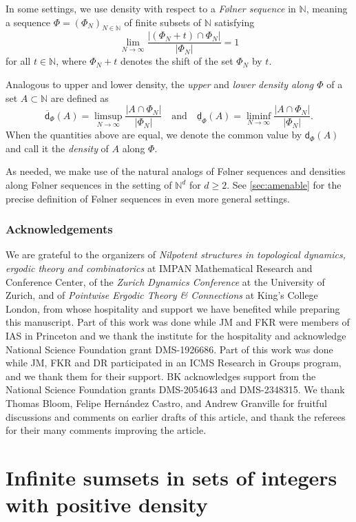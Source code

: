 \documentclass[10pt,dvipsnames]{article}
\theoremstyle{definition}
\theoremstyle{plain}
\newcommand{\define}[1]{\textit{#1}}
\newcommand{\N}{\mathbb{N}}
\newcommand{\dens}{\mathsf{d}}
\newcommand{\udens}{\overline{\mathsf{d}}}
\newcommand{\ldens}{\underline{\mathsf{d}}}
\newcommand{\Folner}{F\o{}lner}
\begin{document}
In some settings, we  use  density with respect to a \define{\Folner{} sequence}  in $\N$, meaning a sequence $\Phi=(\Phi_N)_{N\in\N}$ of finite subsets of  $\N$ satisfying 
$$
\lim_{N\to\infty} \frac{|(\Phi_N+t)\cap \Phi_N|}{|
\Phi_N|} = 1
$$
for all $t\in\N$, where $\Phi_N+t$ denotes the shift of the set $\Phi_N$ by $t$. 

Analogous to upper and lower density, the \define{upper} and \define{lower density along $\Phi$} of a set $A\subset\N$ are defined as
\[
\udens_\Phi(A) = \limsup_{N\to\infty}\frac{|A\cap \Phi_N|}{|\Phi_N|}
\quad
\text{and}
\quad 
\ldens_\Phi(A)=\liminf_{N\to\infty}\frac{|A\cap \Phi_N|}{|\Phi_N|}.
\]
When the quantities above are equal, we denote the common value by $\dens_\Phi(A)$ and call it the \define{density} of $A$ along $\Phi$.

As needed, we make use of the natural  analogs of \Folner{} sequences and densities along \Folner{} sequences in the setting of $\N^d$ for $d\geq 2$.
See \cref{sec:amenable} for the precise definition of \Folner{} sequences in even more general settings.

\subsubsection*{Acknowledgements}
We are grateful to the organizers of \textit{Nilpotent structures in topological dynamics, ergodic theory and combinatorics} at IMPAN Mathematical Research and Conference Center, of the \textit{Zurich Dynamics Conference} at the University of Zurich, and of \textit{Pointwise Ergodic Theory \& Connections} at King's College London,  from whose hospitality and support we have benefited while preparing this manuscript. 
Part of this work was done while JM and FKR were members of IAS in Princeton and we thank the institute for the hospitality and acknowledge National Science Foundation grant  DMS-1926686.
Part of this work was done while JM, FKR and DR participated in an ICMS Research in Groups program, and we thank them for their support.
BK acknowledges support from the National
Science Foundation grants DMS-2054643 and DMS-2348315. We thank Thomas Bloom, Felipe Hern{\'a}ndez Castro, and Andrew Granville for fruitful discussions and comments on earlier drafts of this article, and thank the referees for their many comments improving the article.

\section{Infinite sumsets in sets of integers with positive density}
\label{sec:sumsets_integers}
\end{document}
